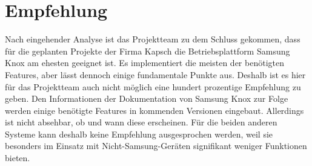 \section{Empfehlung}
Nach eingehender Analyse ist das Projektteam zu dem Schluss gekommen, dass für die geplanten Projekte der Firma Kapsch die Betriebsplattform Samsung Knox am ehesten geeignet ist. Es implementiert die meisten der benötigten Features, aber lässt dennoch einige fundamentale Punkte aus. Deshalb ist es hier für das Projektteam auch nicht möglich eine hundert prozentige Empfehlung zu geben. Den Informationen der Dokumentation von Samsung Knox zur Folge werden einige benötigte Features in kommenden Versionen eingebaut. Allerdings ist nicht absehbar, ob und wann diese erscheinen. Für die beiden anderen Systeme kann deshalb keine Empfehlung ausgesprochen werden, weil sie besonders im Einsatz mit Nicht-Samsung-Geräten signifikant weniger Funktionen bieten.

